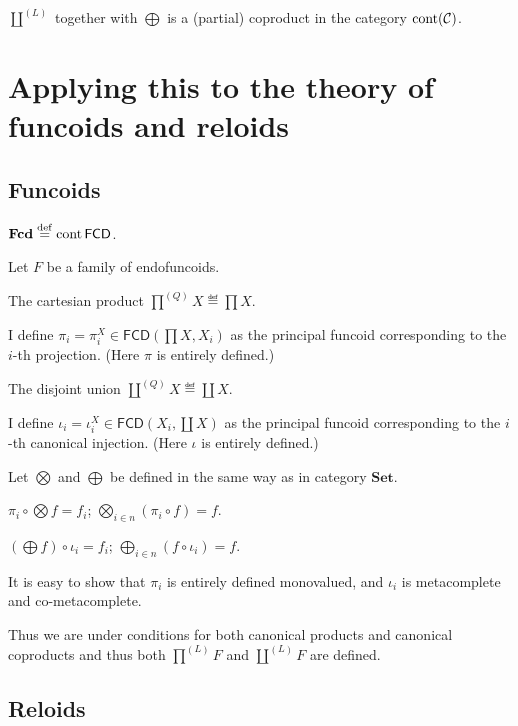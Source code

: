 \begin{thm}
  $\coprod^{(L)}$ together with $\bigoplus$ is a (partial) coproduct in the
  category $\operatorname{cont} (\mathcal{C})$.
\end{thm}

\section{Applying this to the theory of funcoids and reloids}

\subsection{Funcoids}

\begin{defn}
  $\mathbf{Fcd} \overset{\mathrm{def}}{=} \operatorname{cont} \mathsf{FCD}$.
\end{defn}

Let $F$ be a family of endofuncoids.

The cartesian product $\prod^{(Q)} X \eqdef \prod X$.

I define $\pi_i = \pi^X_i \in \mathsf{FCD} \left( \prod X , X_i
\right)$ as the principal funcoid corresponding to the $i$-th projection.
(Here $\pi$ is entirely defined.)

The disjoint union $\coprod^{(Q)} X \eqdef \coprod X$.

I define $\iota_i = \iota^X_i \in \mathsf{FCD} \left( X_i , \coprod X
\right)$ as the principal funcoid corresponding to the $i$-th canonical
injection. (Here $\iota$ is entirely defined.)

Let $\bigotimes$ and $\bigoplus$ be defined in the same way as in category
$\mathbf{Set}$.

\begin{obvious}
$\pi_i \circ \bigotimes f = f_i$; $\bigotimes_{i \in n} (\pi_i \circ f) =
f$.
\end{obvious}

\begin{obvious}
$\left( \bigoplus f \right) \circ \iota_i = f_i$; $\bigoplus_{i \in n} (f
\circ \iota_i) = f$.
\end{obvious}

It is easy to show that $\pi_i$ is entirely defined monovalued, and $\iota_i$
is metacomplete and co-metacomplete.

Thus we are under conditions for both canonical products and canonical
coproducts and thus both $\prod^{(L)} F$ and $\coprod^{(L)} F$ are defined.

\subsection{Reloids}

